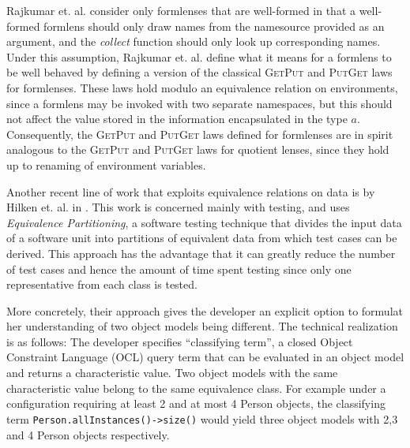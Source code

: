 \documentclass[acmsmall,review,anonymous]{acmart}
\newcommand{\kw}[1]{\textcolor{dkblue}{\ensuremath{\mathsf{#1}}}}
\begin{document}
Rajkumar et. al. consider only formlenses that are well-formed in that a
well-formed formlens should only draw names from the namesource provided as an
argument, and the {\em collect} function should only look up corresponding
names. Under this assumption, Rajkumar et. al. define what it means for a
formlens to be well behaved by defining a version of the classical
\textsc{GetPut} and \textsc{PutGet} laws for formlenses. These laws hold modulo
an equivalence relation on environments, since a formlens may be invoked with
two separate namespaces, but this should not affect the value stored in the
information encapsulated in the type $a$. Consequently, the \textsc{GetPut} and
\textsc{PutGet} laws defined for formlenses are in spirit analogous to the
\textsc{GetPut} and \textsc{PutGet} laws for quotient lenses, since they hold
up to renaming of environment variables.

Another recent line of work that exploits equivalence relations on data is by
Hilken et. al. in \cite{hilken2016testing}. This work is concerned mainly with
testing, and uses {\em Equivalence Partitioning}, a software testing technique
that divides the input data of a software unit into partitions of equivalent
data from which test cases can be derived. This approach has the advantage that
it can greatly reduce the number of test cases and hence the amount of time
spent testing since only one representative from each class is tested.

More concretely, their approach gives the developer an explicit option to
formulat her understanding of two object models being different. The technical
realization is as follows: The developer specifies ``classifying term'', a
closed Object Constraint Language (OCL) query term that can be evaluated in an
object model and returns a characteristic value. Two object models with the same
characteristic value belong to the same equivalence class. For example under a
configuration requiring at least 2 and at most 4 Person objects, the
classifying term \lstinline{Person.allInstances()->size()} would yield three
object models with 2,3 and 4 Person objects respectively.
\end{document}
